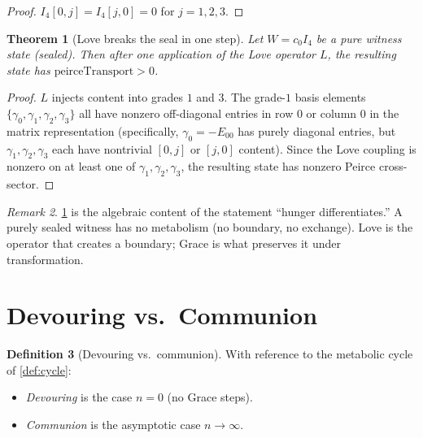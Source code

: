 \documentclass[11pt,a4paper]{article}
\theoremstyle{plain}
\newtheorem{theorem}{Theorem}[section]
\theoremstyle{definition}
\newtheorem{definition}[theorem]{Definition}
\theoremstyle{remark}
\newtheorem{remark}[theorem]{Remark}
\numberwithin{equation}{section}
\begin{document}
\begin{proof}
$I_4[0,j] = I_4[j,0] = 0$ for $j = 1, 2, 3$.
\end{proof}

\begin{theorem}[Love breaks the seal in one step]
\label{thm:love-breaks-seal}
Let $W = c_0 I_4$ be a pure witness state (sealed). Then after one
application of the Love operator $L$, the resulting state has
$\mathrm{peirceTransport} > 0$.
\end{theorem}

\begin{proof}
$L$ injects content into grades $1$ and $3$. The grade-$1$ basis
elements $\{\gamma_0, \gamma_1, \gamma_2, \gamma_3\}$ all have
nonzero off-diagonal entries in row $0$ or column $0$ in the
matrix representation (specifically, $\gamma_0 = -E_{00}$ has
purely diagonal entries, but $\gamma_1, \gamma_2, \gamma_3$ each
have nontrivial $[0, j]$ or $[j, 0]$ content). Since the Love
coupling is nonzero on at least one of $\gamma_1, \gamma_2, \gamma_3$,
the resulting state has nonzero Peirce cross-sector.
\end{proof}

\begin{remark}
\cref{thm:love-breaks-seal} is the algebraic content of the
statement ``hunger differentiates.'' A purely sealed witness has no
metabolism (no boundary, no exchange). Love is the operator that
creates a boundary; Grace is what preserves it under transformation.
\end{remark}

\section{Devouring vs.\ Communion}
\label{sec:devouring}

\begin{definition}[Devouring vs.\ communion]
\label{def:dvc}
With reference to the metabolic cycle of \cref{def:cycle}:
\begin{itemize}
\item \emph{Devouring} is the case $n = 0$ (no Grace steps).
\item \emph{Communion} is the asymptotic case $n \to \infty$.
\end{itemize}
\end{definition}
\end{document}

